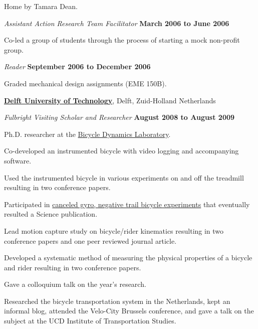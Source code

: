\documentclass[10pt]{article}
\newenvironment{outerlist}[1][\enskip\textbullet]%
        {\begin{itemize}[#1]}{\end{itemize}%
         \vspace{-.6\baselineskip}}
\newenvironment{innerlist}[1][\enskip\textbullet]%
        {\begin{compactitem}[#1]}{\end{compactitem}}
\newcommand{\blankline}{\quad\pagebreak[2]}
\begin{document}
\begin{outerlist}
\begin{innerlist}
{{        Home}} by Tamara Dean.
  \end{innerlist}
  \item[] \textit{Assistant Action Research Team Facilitator}%
    \hfill \textbf{March 2006 to June 2006}
  \begin{innerlist}
    \item Co-led a group of students through the process of starting a mock
        non-profit group.
  \end{innerlist}
  \item[] \textit{Reader}%
    \hfill \textbf{September 2006 to December 2006}
  \begin{innerlist}
    \item Graded mechanical design assignments (EME 150B).
  \end{innerlist}
\end{outerlist}

\blankline

\href{http://www.tudelft.nl}{\textbf{Delft University of Technology}}, Delft, Zuid-Holland Netherlands
\begin{outerlist}
  \item[] \textit{Fulbright Visiting Scholar and Researcher}%
        \hfill \textbf{August 2008 to August 2009}
  \begin{innerlist}
    \item Ph.D. researcher at the \href{http://bicycle.tudelft.nl}{Bicycle Dynamics Laboratory}.
    \item Co-developed an instrumented bicycle with video logging and
        accompanying software.
    \item Used the instrumented bicycle in various experiments on and off the
        treadmill resulting in two conference papers.
    \item Participated in
        \href{http://dx.doi.org/10.1126/science.1201959}{canceled gyro,
        negative trail bicycle experiments} that eventually resulted a Science
        publication.
    \item Lead motion capture study on bicycle/rider kinematics resulting in
        two conference papers and one peer reviewed journal article.
    \item Developed a systematic method of measuring the physical properties of
        a bicycle and rider resulting in two conference papers.
    \item Gave a colloquium talk on the year's research.
    \item Researched the bicycle transportation system in the Netherlands, kept
        an informal blog, attended the Velo-City Brussels conference, and gave
        a talk on the subject at the UCD Institute of Transportation Studies.
  \end{innerlist}
\end{outerlist}
\end{document}
